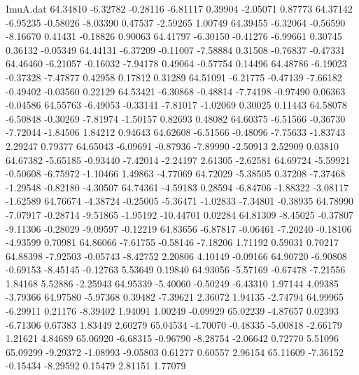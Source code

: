 \begin{filecontents}{ImuA.dat}
  64.34810   -6.32782   -0.28116   -6.81117    0.39904   -2.05071    0.87773
  64.37142   -6.95235   -0.58026   -8.03390    0.47537   -2.59265    1.00749
  64.39455   -6.32064   -0.56590   -8.16670    0.41431   -0.18826    0.90063
  64.41797   -6.30150   -0.41276   -6.99661    0.30745    0.36132   -0.05349
  64.44131   -6.37209   -0.11007   -7.58884    0.31508   -0.76837   -0.47331
  64.46460   -6.21057   -0.16032   -7.94178    0.49064   -0.57754    0.14496
  64.48786   -6.19023   -0.37328   -7.47877    0.42958    0.17812    0.31289
  64.51091   -6.21775   -0.47139   -7.66182   -0.49402   -0.03560    0.22129
  64.53421   -6.30868   -0.48814   -7.74198   -0.97490    0.06363   -0.04586
  64.55763   -6.49053   -0.33141   -7.81017   -1.02069    0.30025    0.11443
  64.58078   -6.50848   -0.30269   -7.81974   -1.50157    0.82693    0.48082
  64.60375   -6.51566   -0.36730   -7.72044   -1.84506    1.84212    0.94643
  64.62608   -6.51566   -0.48096   -7.75633   -1.83743    2.29247    0.79377
  64.65043   -6.09691   -0.87936   -7.89990   -2.50913    2.52909    0.03810
  64.67382   -5.65185   -0.93440   -7.42014   -2.24197    2.61305   -2.62581
  64.69724   -5.59921   -0.50608   -6.75972   -1.10466    1.49863   -4.77069
  64.72029   -5.38505    0.37208   -7.37468   -1.29548   -0.82180   -4.30507
  64.74361   -4.59183    0.28594   -6.84706   -1.88322   -3.08117   -1.62589
  64.76674   -4.38724   -0.25005   -5.36471   -1.02833   -7.34801   -0.38935
  64.78990   -7.07917   -0.28714   -9.51865   -1.95192  -10.44701    0.02284
  64.81309   -8.45025   -0.37807   -9.11306   -0.28029   -9.09597   -0.12219
  64.83656   -6.87817   -0.06461   -7.20240   -0.18106   -4.93599    0.70981
  64.86066   -7.61755   -0.58146   -7.18206    1.71192    0.59031    0.70217
  64.88398   -7.92503   -0.05743   -8.42752    2.20806    4.10149   -0.09166
  64.90720   -6.90808   -0.69153   -8.45145   -0.12763    5.53649    0.19840
  64.93056   -5.57169   -0.67478   -7.21556    1.84168    5.52886   -2.25943
  64.95339   -5.40060   -0.50249   -6.43310    1.97144    4.09385   -3.79366
  64.97580   -5.97368    0.39482   -7.39621    2.36072    1.94135   -2.74794
  64.99965   -6.29911    0.21176   -8.39402    1.94091    1.00249   -0.09929
  65.02239   -4.87657    0.02393   -6.71306    0.67383    1.83449    2.60279
  65.04534   -4.70070   -0.48335   -5.00818   -2.66179    1.21621    4.84689
  65.06920   -6.68315   -0.96790   -8.28754   -2.06642    0.72770    5.51096
  65.09299   -9.29372   -1.08993   -9.05803    0.61277    0.60557    2.96154
  65.11609   -7.36152   -0.15434   -8.29592    0.15479    2.81151    1.77079

\end{filecontents}
